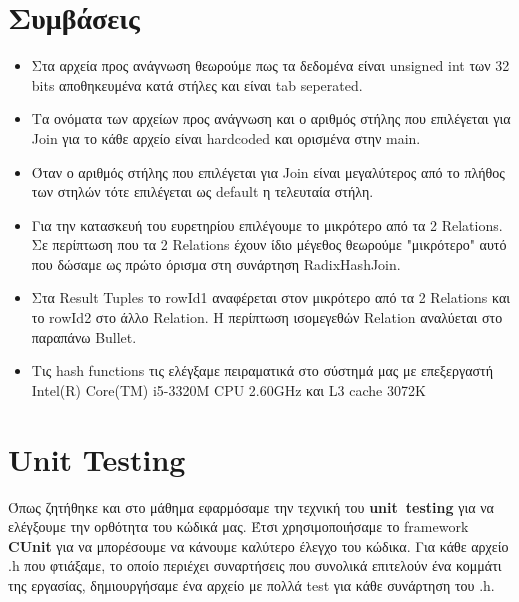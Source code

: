 \documentclass[12pt, a4paper]{article}
\begin{document}
\section{Συμβάσεις}
\begin{itemize}
	\item Στα αρχεία προς ανάγνωση θεωρούμε πως τα δεδομένα είναι unsigned int των 32 bits αποθηκευμένα κατά στήλες και είναι tab seperated.
	\item Τα ονόματα των αρχείων προς ανάγνωση και ο αριθμός στήλης που επιλέγεται για Join για το κάθε αρχείο είναι hardcoded και ορισμένα στην main.
	\item Όταν ο αριθμός στήλης που επιλέγεται για Join είναι μεγαλύτερος από το πλήθος των στηλών τότε επιλέγεται ως default η τελευταία στήλη.
	\item Για την κατασκευή του ευρετηρίου επιλέγουμε το μικρότερο από τα 2 Relations. Σε περίπτωση που τα 2 Relations έχουν ίδιο μέγεθος θεωρούμε "μικρότερο" αυτό που δώσαμε ως πρώτο όρισμα στη συνάρτηση RadixHashJoin.
	\item Στα Result Tuples το rowId1 αναφέρεται στον μικρότερο από τα 2 Relations και το rowId2 στο άλλο Relation. Η περίπτωση ισομεγεθών Relation αναλύεται στο παραπάνω Bullet.
	\item Τις hash functions τις ελέγξαμε πειραματικά στο σύστημά μας με επεξεργαστή Intel(R) Core(TM) i5-3320M CPU 2.60GHz και L3 cache 3072K 
\end{itemize}


\section{Unit Testing}
Όπως ζητήθηκε και στο μάθημα εφαρμόσαμε την τεχνική του \textbf{unit\ testing} για να ελέγξουμε την ορθότητα του κώδικά μας. Έτσι χρησιμοποιήσαμε το framework \textbf{CUnit} για να μπορέσουμε να κάνουμε καλύτερο έλεγχο του κώδικα. Για κάθε αρχείο .h που φτιάξαμε, το οποίο περιέχει συναρτήσεις που συνολικά επιτελούν ένα κομμάτι της εργασίας, δημιουργήσαμε ένα αρχείο με πολλά test για κάθε συνάρτηση του .h. 
\end{document}
